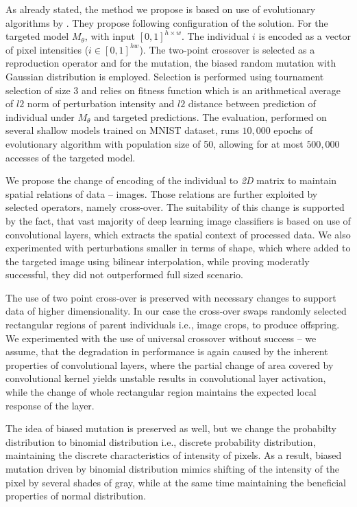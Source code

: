 As already stated, the method we propose is based on use of evolutionary algorithms by \cite{Vidnerova:2016:EGA:2955129.2955178}. They propose following configuration of the solution. For the targeted model $M_\theta$, with input $[0,1]^{h \times w}$. The individual $i$ is encoded as a vector of pixel intensities ($i \in [0, 1]^{h w}$). The two-point crossover is selected as a reproduction operator and for the mutation, the biased random mutation with Gaussian distribution is employed. Selection is performed using tournament selection of size 3 and relies on fitness function which is an arithmetical average of $l2$ norm of perturbation intensity and $l2$ distance between prediction of individual under $M_\theta$ and targeted predictions. The evaluation, performed on several shallow models trained on MNIST dataset, runs $10,000$ epochs of evolutionary algorithm with population size of 50, allowing for at most $500,000$ accesses of the targeted model.

We propose the change of encoding of the individual to \emph{2D} matrix to maintain spatial relations of data -- images. Those relations are further exploited by selected operators, namely cross-over. The suitability of this change is supported by the fact, that vast majority of deep learning image classifiers is based on use of convolutional layers, which extracts the spatial context of processed data. We also experimented with perturbations smaller in terms of shape, which where added to the targeted image using bilinear interpolation, while proving moderatly successful, they did not outperformed full sized scenario.

The use of two point cross-over is preserved with necessary changes to support data of higher dimensionality. In our case the cross-over swaps randomly selected rectangular regions of parent individuals i.e., image crops, to produce offspring. We experimented with the use of universal crossover without success -- we assume, that the degradation in performance is again caused by the inherent properties of convolutional layers, where the partial change of area covered by convolutional kernel yields unstable results in convolutional layer activation, while the change of whole rectangular region maintains the expected local response of the layer.

The idea of biased mutation is preserved as well, but we change the probabilty distribution to binomial distribution i.e., discrete probability distribution, maintaining the discrete characteristics of intensity of pixels. As a result, biased mutation driven by binomial distribution mimics shifting of the intensity of the pixel by several shades of gray, while at the same time maintaining the beneficial properties of normal distribution.

